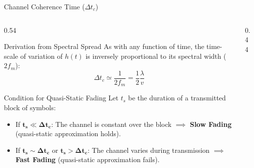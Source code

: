 \documentclass[aspectratio=169, 10pt]{beamer}
\begin{document}
\begin{frame}{Channel Coherence Time ($\Delta t_c$)}
    \begin{columns}[T]
        \begin{column}{0.54\textwidth}
        \vspace{-1em}
            \begin{block}{Derivation from Spectral Spread}
                \small
                As with any function of time, the time-scale of variation of $h(t)$ is inversely proportional to its spectral width ($2f_m$):
                \begin{equation}
                    \boxed{\Delta t_c \simeq \frac{1}{2 f_m} = \frac{1}{2}\frac{\lambda}{v}}
                \end{equation}
            \end{block}

            \begin{alertblock}{Condition for Quasi-Static Fading}
            \small
                Let $t_s$ be the duration of a transmitted block of symbols:
                \begin{itemize}
                    \item If $\mathbf{t_s \ll \Delta t_c}$: The channel is constant over the block $\implies$ \textbf{Slow Fading} (quasi-static approximation holds).
                    \item If $\mathbf{t_s \sim \Delta t_c}$ or $\mathbf{t_s > \Delta t_c}$: The channel varies during transmission $\implies$ \textbf{Fast Fading} (quasi-static approximation fails).
                \end{itemize}
            \end{alertblock}
        \end{column}

        \begin{column}{0.44\textwidth}
            \begin{center}
\end{center}
\end{column}
\end{columns}
\end{frame}
\end{document}
